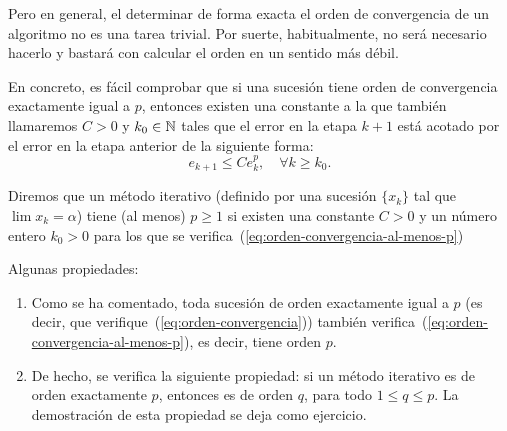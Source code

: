 Pero en general, el determinar de forma exacta el orden de
convergencia de un algoritmo no es una tarea trivial. Por suerte,
habitualmente, no será necesario hacerlo y bastará con calcular el
orden en un sentido más débil.

En concreto, es fácil comprobar que si una sucesión tiene orden de
convergencia exactamente igual a $p$, entonces existen una constante a
la que también llamaremos $C>0$ y $k_0\in\operatorname{{\mathbb N}}$ tales que el error en
la etapa $k+1$ está acotado por el error en la etapa anterior de la
siguiente forma:
\begin{equation}
  \label{eq:orden-convergencia-al-menos-p}
  e_{k+1} \le C e_k^p, \quad \forall k\ge k_0.
\end{equation}

\begin{definition}
  Diremos que un método iterativo (definido por una sucesión $\{x_k\}$
  tal que $\lim x_k=\alpha$) tiene 
  (al menos) $p\ge 1$ si existen una constante $C>0$ y un número
  entero $k_0>0$ para los que se
  verifica~(\ref{eq:orden-convergencia-al-menos-p})
  \label{def:orden-convergencia-al-menos-p}
\end{definition}


\begin{remark}
  Algunas propiedades:
  \begin{enumerate}
  \item Como se ha comentado, toda sucesión de orden exactamente igual
    a $p$ (es decir, que verifique~(\ref{eq:orden-convergencia}))
    también verifica~(\ref{eq:orden-convergencia-al-menos-p}), es
    decir, tiene orden $p$.
  \item De hecho, se verifica la siguiente propiedad: si un método
    iterativo es de orden exactamente $p$, entonces es de orden $q$,
    para todo $1\le q \le p$. La demostración de esta propiedad se
    deja como ejercicio.
  \end{enumerate}
\end{remark}





